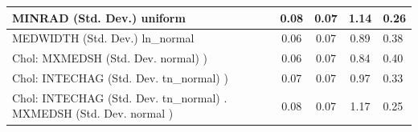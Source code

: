 \begin{table}
\begin{center}
\begin{tabular}{|l|l|c|c|c|l|}
			\hline
			MINRAD (Std. Dev.) uniform &  & 0.08 & 0.07 & 1.14 & 0.26 \\
			\hline
			MEDWIDTH (Std. Dev.) ln_normal &  & 0.06 & 0.07 & 0.89 & 0.38 \\
			\hline
			 Chol: MXMEDSH (Std. Dev. normal) ) &  & 0.06 & 0.07 & 0.84 & 0.40 \\
			\hline
			 Chol: INTECHAG (Std. Dev. tn_normal) ) &  & 0.07 & 0.07 & 0.97 & 0.33 \\
			\hline
			 Chol: INTECHAG (Std. Dev. tn_normal) . MXMEDSH (Std. Dev.   normal ) &  & 0.08 & 0.07 & 1.17 & 0.25 \\
			\hline
		\end{tabular}
	\end{center}
\end{table}